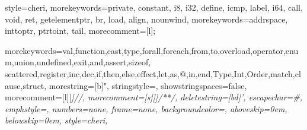 \let\ea\expandafter

\usepackage[scaled=0.82]{beramono}




\usepackage[colorlinks]{hyperref}
\usepackage[toc,nonumberlist]{glossaries}
\usepackage[nottoc]{tocbibind}
\usepackage[capitalise]{cleveref}
\usepackage{footnote}
\usepackage{threeparttable}
{
	style=cheri,
	morekeywords={private, constant, i8, i32, define, icmp, label, i64, call, void, ret, getelementptr, br, load, align, nounwind},
	morekeywords={addrspace, inttoptr, ptrtoint, tail},
	morecomment=[l];
}%

  { morekeywords={val,function,cast,type,forall,foreach,from,to,overload,operator,enum,union,undefined,exit,and,assert,sizeof,
      scattered,register,inc,dec,if,then,else,effect,let,as,@,in,end,Type,Int,Order,match,clause,struct},
    morestring=[b]",
    stringstyle={\ttfamily\color{red}},
    showstringspaces=false,
    morecomment=[l][\itshape\color{DarkGreen}]{//},
    morecomment=[s][\itshape\color{DarkGreen}]{/*}{*/},
    deletestring=[bd]{'},
    escapechar=\#,
    emphstyle={\it},
    numbers=none,
    frame=none,
    backgroundcolor=\color{White},
    aboveskip=0em,
    belowskip=0em,
    style=cheri,
  }

